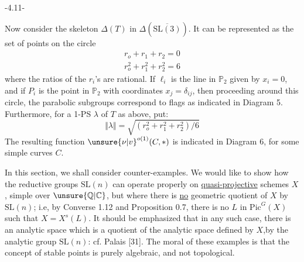 \begin{center}-4.11-\end{center}
Now consider the skeleton $\Delta(T)$ in $\Delta(\overline{\mathrm{SL}(3)})$. It can be represented as the set of points on the circle
\[\begin{gathered}r_o+r_1+r_2=0\\r_o^2+r_1^2+r_2^2=6\end{gathered}\]
where the ratios of the $r_i$'s are rational. If $\ell_i$ is the line in $\mathbb P_2$ given by $x_i=0$, and if $P_i$ is the point in $\mathbb P_2$ with coordinates $x_j=\delta_{ij}$, then proceeding around this circle, the parabolic subgroups correspond to flags as indicated in Diagram 5. Furthermore, for a 1-PS $\lambda$ of $T$ as above, put:
\[\Vert\lambda\Vert=\sqrt{(r_o^2+r_1^2+r_2^2)/6}\]
The resulting function $\unsure{\nu|v}^{o(1)}(C,*)$ is indicated in Diagram 6, for some simple curves $C$.

 In this section, we shall consider counter-examples. We would like to show how the reductive groups $\mathrm{SL}(n)$ can operate properly on \uline{quasi-projective} schemes $X$, simple over $\unsure{\mathbb Q|\mathbb C}$, but where there is \uline{no} geometric quotient of $X$ by $\mathrm{SL}(n)$; i.e, by Converse 1.12 and Proposition 0.7, there is no $L$ in $\mathrm{Pic}^G(X)$ such that $X=X^s(L)$. It should be emphasized that in any such case, there is an analytic space which is a quotient of the analytic space defined by $X$,by the analytic group $\mathrm{SL}(n)$: cf. Palais [31]. The moral of these examples is that the concept of stable points is purely algebraic, and not topological.
